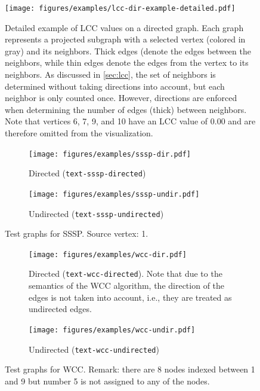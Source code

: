 \begin{figure}[h]
	\centering
	\texttt{[image: figures/examples/lcc-dir-example-detailed.pdf]}
	\caption{Detailed example of LCC values on a directed graph. Each graph represents a projected subgraph with a selected vertex (colored in gray) and its neighbors.
		Thick edges (denote the edges between the neighbors, while thin edges denote the edges from the vertex to its neighbors.
		As discussed in \autoref{sec:lcc}, the set of neighbors is determined without taking directions into account, but each neighbor is only counted once. However, directions are enforced when determining the number of edges (thick) between neighbors.
		Note that vertices 6, 7, 9, and 10 have an LCC value of 0.00 and are therefore omitted from the visualization.}
	\label{fig:lcc_dir_example_detailed}
\end{figure}

\begin{figure}[h]
	\centering
	\begin{subfigure}{0.496\textwidth}
		\centering
		\texttt{[image: figures/examples/sssp-dir.pdf]}
		\caption{Directed (\texttt{text-sssp-directed})}
	\end{subfigure}
	\begin{subfigure}{0.496\textwidth}
		\centering
		\texttt{[image: figures/examples/sssp-undir.pdf]}
		\caption{Undirected (\texttt{text-sssp-undirected})}
	\end{subfigure}
	\caption{Test graphs for SSSP. Source vertex: 1.}
	\label{fig:sssp_example}
\end{figure}

\begin{figure}[h]
	\centering
	\begin{subfigure}[t]{0.496\textwidth}
		\centering
		\texttt{[image: figures/examples/wcc-dir.pdf]}
		\caption{Directed (\texttt{text-wcc-directed}). Note that due to the semantics of the WCC algorithm, the direction of the edges is not taken into account, i.e., they are treated as undirected edges.}
	\end{subfigure}
	\begin{subfigure}[t]{0.496\textwidth}
		\centering
		\texttt{[image: figures/examples/wcc-undir.pdf]}
		\caption{Undirected (\texttt{text-wcc-undirected})}
	\end{subfigure}
	\caption{Test graphs for WCC. Remark: there are 8 nodes indexed between 1 and 9 but number 5 is not assigned to any of the nodes.}
	\label{fig:wcc_example}
\end{figure}

